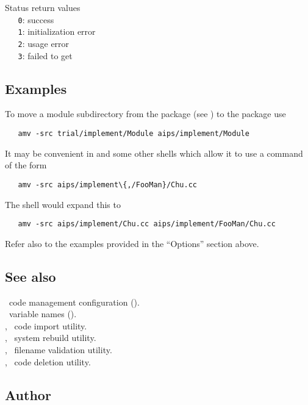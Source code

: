 Status return values
\\ \verb+   0+:  success
\\ \verb+   1+:  initialization error
\\ \verb+   2+:  usage error
\\ \verb+   3+:  failed to get 

\subsection*{Examples}

To move a module subdirectory from the  package (see ) to the  package use

\begin{verbatim}
   amv -src trial/implement/Module aips/implement/Module
\end{verbatim}

\noindent
It may be convenient in  and some other shells which allow it to
use a command of the form

\begin{verbatim}
   amv -src aips/implement\{,/FooMan}/Chu.cc
\end{verbatim}

\noindent
The shell would expand this to

\begin{verbatim}
   amv -src aips/implement/Chu.cc aips/implement/FooMan/Chu.cc
\end{verbatim}

\noindent
Refer also to the examples provided in the ``Options'' section above.

\subsection*{See also}

\aipspp\ code management configuration ().\\
\aipspp\ variable names ().\\
, \aipspp\ code import utility.\\
, \aipspp\ system rebuild utility.\\
, \aipspp\ filename validation utility.\\
, \aipspp\ code deletion utility.

\subsection*{Author}

